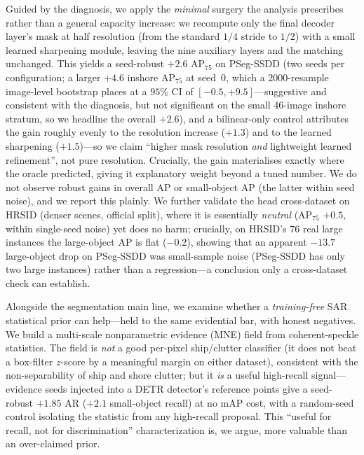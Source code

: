 \documentclass[journal]{IEEEtran}
\begin{document}
Guided by the diagnosis, we apply the \emph{minimal} surgery the analysis prescribes rather than a general capacity increase: we recompute only the final decoder layer's mask at half resolution (from the standard $1/4$ stride to $1/2$) with a small learned sharpening module, leaving the nine auxiliary layers and the matching unchanged. This yields a seed-robust $+2.6$ AP$_{75}$ on PSeg-SSDD (two seeds per configuration; a larger $+4.6$ inshore AP$_{75}$ at seed~0, which a $2000$-resample image-level bootstrap places at a $95\%$ CI of $[-0.5,+9.5]$---suggestive and consistent with the diagnosis, but not significant on the small 46-image inshore stratum, so we headline the overall $+2.6$), and a bilinear-only control attributes the gain roughly evenly to the resolution increase ($+1.3$) and to the learned sharpening ($+1.5$)---so we claim ``higher mask resolution \emph{and} lightweight learned refinement'', not pure resolution. Crucially, the gain materialises exactly where the oracle predicted, giving it explanatory weight beyond a tuned number. We do not observe robust gains in overall AP or small-object AP (the latter within seed noise), and we report this plainly. We further validate the head cross-dataset on HRSID (denser scenes, official split), where it is essentially \emph{neutral} (AP$_{75}$ $+0.5$, within single-seed noise) yet does no harm; crucially, on HRSID's $76$ real large instances the large-object AP is flat ($-0.2$), showing that an apparent $-13.7$ large-object drop on PSeg-SSDD was small-sample noise (PSeg-SSDD has only two large instances) rather than a regression---a conclusion only a cross-dataset check can establish.

Alongside the segmentation main line, we examine whether a \emph{training-free} SAR statistical prior can help---held to the same evidential bar, with honest negatives. We build a multi-scale nonparametric evidence (MNE) field from coherent-speckle statistics. The field is \emph{not} a good per-pixel ship/clutter classifier (it does not beat a box-filter $z$-score by a meaningful margin on either dataset), consistent with the non-separability of ship and shore clutter; but it \emph{is} a useful high-recall signal---evidence seeds injected into a DETR detector's reference points give a seed-robust $+1.85$ AR ($+2.1$ small-object recall) at no mAP cost, with a random-seed control isolating the statistic from any high-recall proposal. This ``useful for recall, not for discrimination'' characterization is, we argue, more valuable than an over-claimed prior.
\end{document}
